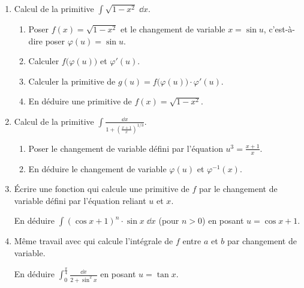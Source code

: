\documentclass[class=report,crop=false]{standalone}
\begin{document}
\begin{tp}
\sauteligne
\begin{enumerate}
  \item Calcul de la primitive $\displaystyle\int \sqrt{1-x^2} \; \dd x$.
  \begin{enumerate}
    \item Poser $f(x) = \sqrt{1-x^2}$ et le changement de variable $x = \sin u$, c'est-à-dire poser 
    $\varphi(u) = \sin u$.
    \item Calculer $f\big( \varphi(u) \big)$ et $\varphi'(u)$.
    \item Calculer la primitive de $g(u) = f\big(\varphi(u)\big)\cdot\varphi'(u)$.
    \item En déduire une primitive de $f(x) = \sqrt{1-x^2}$.
  \end{enumerate}
  
  \item Calcul de la primitive $\displaystyle\int \frac{\dd x}{1+\left(\frac{x+1}{x}\right)^{1/3}}$.
  \begin{enumerate}  
    \item Poser le changement de variable défini par l'équation $u^3 = \frac{x+1}{x}$.
    
    \item En déduire le changement de variable $\varphi(u)$ et $\varphi^{-1}(x)$.
  \end{enumerate}
  
  
  \item \'Ecrire une fonction  qui calcule
  une primitive de $f$ par le changement de variable défini par l'équation 
   reliant $u$ et $x$.
  
  En déduire $\displaystyle\int (\cos x + 1)^n \cdot \sin x \; \dd x$ (pour $n>0$) en posant $u= \cos x + 1$.
  
  \item Même travail avec 
  qui calcule l'intégrale de $f$ entre $a$ et $b$ par changement de variable.
  
  En déduire $\displaystyle\int_0^{\frac\pi4} \frac{\dd x}{2+\sin^2 x}$ en posant $u = \tan x$.
\end{enumerate}
\end{tp}
\end{document}
